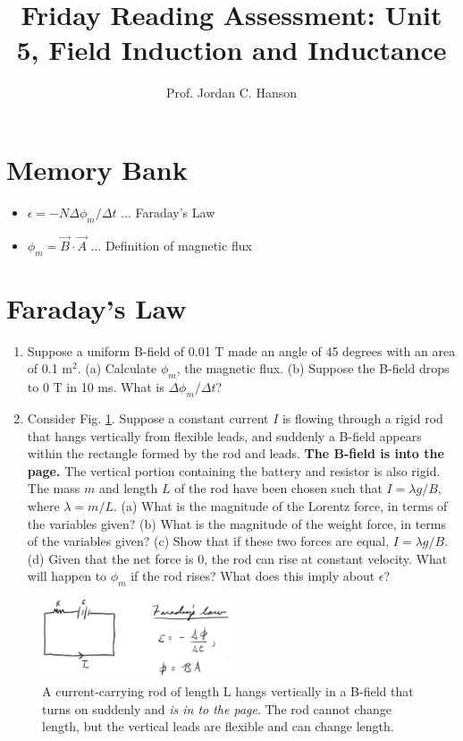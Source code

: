 \documentclass{article}
\begin{document}
\title{Friday Reading Assessment: Unit 5, Field Induction and Inductance}
\author{Prof. Jordan C. Hanson}

\maketitle

\section{Memory Bank}

\begin{itemize}
\item $\epsilon = -N \Delta \phi_m /\Delta t$ ... Faraday's Law
\item $\phi_m = \vec{B} \cdot \vec{A}$ ... Definition of magnetic flux
\end{itemize}

\section{Faraday's Law}

\begin{enumerate}
\item Suppose a uniform B-field of 0.01 T made an angle of 45 degrees with an area of 0.1 m$^2$.  (a) Calculate $\phi_m$, the magnetic flux. (b) Suppose the B-field drops to 0 T in 10 ms.  What is $\Delta \phi_m / \Delta t$? \\ \vspace{2cm}
\item Consider Fig. \ref{fig:current}.  Suppose a constant current $I$ is flowing through a rigid rod that hangs vertically from flexible leads, and suddenly a B-field appears within the rectangle formed by the rod and leads.  \textbf{The B-field is into the page.}  The vertical portion containing the battery and resistor is also rigid.  The mass $m$ and length $L$ of the rod have been chosen such that $I = \lambda g / B$, where $\lambda = m/L$.  (a) What is the magnitude of the Lorentz force, in terms of the variables given?  (b) What is the magnitude of the weight force, in terms of the variables given?  (c)  Show that if these two forces are equal, $I = \lambda g / B$. (d) Given that the net force is 0, the rod can rise at constant velocity.  What will happen to $\phi_m$ if the rod rises?  What does this imply about $\epsilon$? 
\end{enumerate}
\begin{figure}
\centering
\includegraphics[width=0.5\textwidth]{current.png}
\caption{\label{fig:current} A current-carrying rod of length L hangs vertically in a B-field that turns on suddenly and \textit{is in to the page}.  The rod cannot change length, but the vertical leads are flexible and can change length.}
\end{figure}
\end{document}
